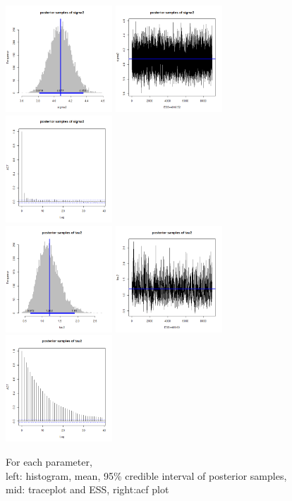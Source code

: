 \documentclass{article}
\begin{document}
\begin{figure}[!h]
    \includegraphics[width=4cm]{sigma2_hist.png}
    \includegraphics[width=4cm]{sigma2_traceplot.png}
    \includegraphics[width=4cm]{sigma2_acf.png} \\
    \includegraphics[width=4cm]{tau2_hist.png}
    \includegraphics[width=4cm]{tau2_traceplot.png}
    \includegraphics[width=4cm]{tau2_acf.png}
    \caption{For each parameter, \\left: histogram, mean, 95\% credible interval of posterior samples, mid: traceplot and ESS, right:acf plot}
\end{figure}
\end{document}
